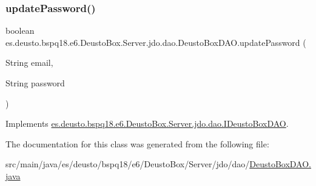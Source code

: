 \mbox{\label{classes_1_1deusto_1_1bspq18_1_1e6_1_1_deusto_box_1_1_server_1_1jdo_1_1dao_1_1_deusto_box_d_a_o_aee61a6f577f75d59d725644c1fc47f6b}} 
\subsubsection{\texorpdfstring{update\+Password()}{updatePassword()}}
{\footnotesize\ttfamily boolean es.\+deusto.\+bspq18.\+e6.\+Deusto\+Box.\+Server.\+jdo.\+dao.\+Deusto\+Box\+D\+A\+O.\+update\+Password (\begin{DoxyParamCaption}\item[{String}]{email,  }\item[{String}]{password }\end{DoxyParamCaption})}



Implements \mbox{\hyperlink{interfacees_1_1deusto_1_1bspq18_1_1e6_1_1_deusto_box_1_1_server_1_1jdo_1_1dao_1_1_i_deusto_box_d_a_o_a578dbf0e8ac83f96643e06621afaa6ce}{es.\+deusto.\+bspq18.\+e6.\+Deusto\+Box.\+Server.\+jdo.\+dao.\+I\+Deusto\+Box\+D\+AO}}.



The documentation for this class was generated from the following file\+:\begin{DoxyCompactItemize}
\item 
src/main/java/es/deusto/bspq18/e6/\+Deusto\+Box/\+Server/jdo/dao/\mbox{\hyperlink{_deusto_box_d_a_o_8java}{Deusto\+Box\+D\+A\+O.\+java}}\end{DoxyCompactItemize}
